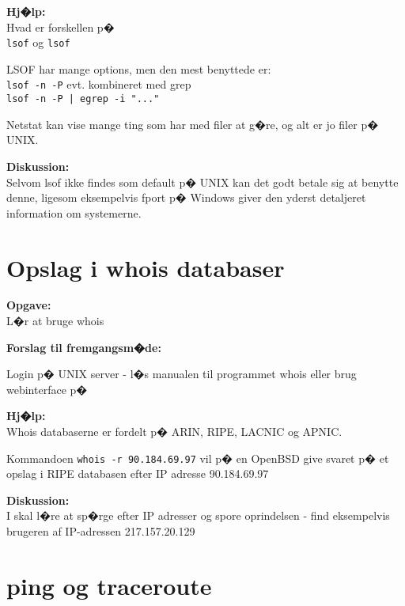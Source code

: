 \documentclass[a4paper,11pt,notitlepage]{oevelser}
\begin{document}
{\bfseries Hj�lp:}\\
Hvad er forskellen p�\\
\verb+lsof+ og \verb+lsof+

LSOF har mange options, men den mest benyttede er:\\
\verb+lsof -n -P+ evt. kombineret med grep\\
\verb+lsof -n -P | egrep -i "..."+

Netstat kan vise mange ting som har med filer at g�re, og alt er jo
filer p� UNIX.

{\bfseries Diskussion:}\\
Selvom lsof ikke findes som default p� UNIX kan det godt betale sig at
benytte denne, ligesom eksempelvis fport p� Windows giver den
yderst detaljeret information om systemerne.







\chapter{Opslag i whois databaser}
\label{ex:whois}


{\bfseries Opgave:} \\
L�r at bruge whois

{\bfseries Forslag til fremgangsm�de:}\\
\begin{list2}
\item Login p� UNIX server - l�s manualen til programmet whois
eller brug webinterface p�\\ 
\end{list2}

{\bfseries Hj�lp:}\\
Whois databaserne er fordelt p� ARIN, RIPE, LACNIC og APNIC.

Kommandoen \verb+whois -r 90.184.69.97+ vil p� en OpenBSD give
svaret p� et opslag i RIPE databasen efter IP adresse 90.184.69.97

{\bfseries Diskussion:}\\
I skal l�re at sp�rge efter IP adresser og spore oprindelsen - find
eksempelvis brugeren af IP-adressen 217.157.20.129



\chapter{ping og traceroute}
\label{ex:ping}
\end{document}

